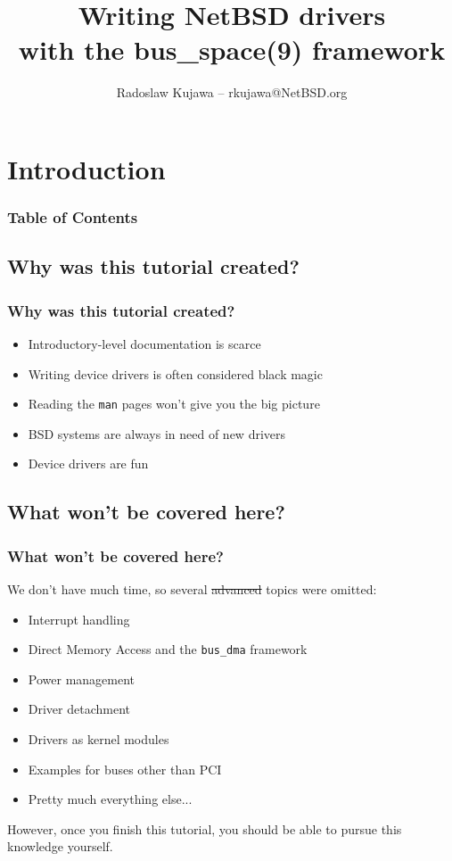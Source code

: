 \documentclass[dvipsnames,table]{beamer}
\title{Writing NetBSD drivers\\with the bus\_space(9) framework}
\author{Radoslaw Kujawa -- rkujawa@NetBSD.org}
\institute{The NetBSD Foundation}
\begin{document}
\section{Introduction}

\begin{frame}
\titlepage
\end{frame}

\begin{frame}[allowframebreaks]
\frametitle{Table of Contents}
{
\hypersetup{colorlinks=true,linkcolor=black,urlcolor=NetBSD-orange}
\tableofcontents
}
\end{frame}

\subsection{Why was this tutorial created?}

\begin{frame}
\frametitle{Why was this tutorial created?}
\begin{itemize}
	\item Introductory-level documentation is scarce
	\item Writing device drivers is often considered black magic
	\item Reading the {\tt man} pages won't give you the big picture
	\item BSD systems are always in need of new drivers
	\item Device drivers are fun {\Large \smiley}
\end{itemize}
\end{frame}

\subsection{What won't be covered here?}

\begin{frame}
\frametitle{What won't be covered here?}
We don't have much time, so several \sout{advanced} topics were omitted:
\begin{itemize}
	\item Interrupt handling
	\item Direct Memory Access and the {\tt bus\_dma} framework
	\item Power management
	\item Driver detachment
	\item Drivers as kernel modules
	\item Examples for buses other than PCI
	\item Pretty much everything else...
\end{itemize}
However, once you finish this tutorial, you should be able to pursue this knowledge yourself.
\end{frame}
\end{document}
